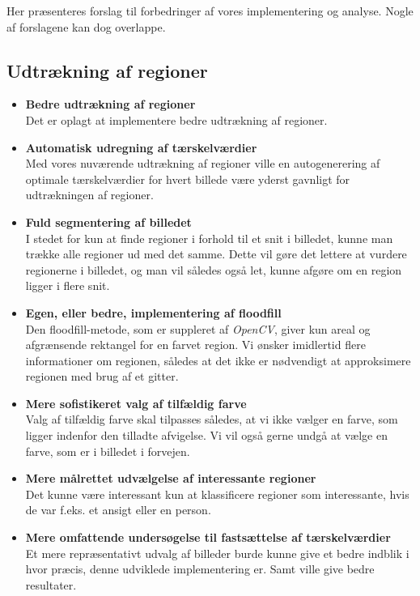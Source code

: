 {
{\sffamily Her præsenteres forslag til forbedringer af vores
implementering og analyse. Nogle af forslagene kan dog overlappe.
}

\subsection{Udtrækning af regioner}
\begin{itemize}
     \item \textbf{Bedre udtrækning af regioner}\\
        Det er oplagt at implementere bedre udtrækning af regioner.
     \item \textbf{Automatisk udregning af tærskelværdier}\\
        Med vores nuværende udtrækning af regioner ville en
        autogenerering af optimale tærskelværdier for hvert billede
        være yderst gavnligt for udtrækningen af regioner.
    \item \textbf{Fuld segmentering af billedet}\\
        I stedet for kun at finde regioner i forhold til et snit i
        billedet, kunne man trække alle regioner ud med det samme. Dette
        vil gøre det lettere at vurdere regionerne i billedet, og man
        vil således også let, kunne afgøre om en region ligger i flere snit.
  \item \textbf{Egen, eller bedre, implementering af floodfill}\\
        Den floodfill-metode, som er suppleret af \emph{OpenCV}, giver
        kun areal og afgrænsende rektangel for en farvet region. Vi
        ønsker imidlertid flere informationer om regionen, således at
        det ikke er nødvendigt at approksimere regionen med brug af et
        gitter.
    \item \textbf{Mere sofistikeret valg af tilfældig farve}\\
        Valg af tilfældig farve skal tilpasses således, at vi ikke
        vælger en farve, som ligger indenfor den tilladte afvigelse.
        Vi vil også gerne undgå at vælge en farve, som er i billedet i
        forvejen.
    \item \textbf{Mere målrettet udvælgelse af interessante regioner}\\
        Det kunne være interessant kun at klassificere regioner som
        interessante, hvis de var f.eks. et ansigt eller en person.
    \item \textbf{Mere omfattende undersøgelse til fastsættelse af tærskelværdier}\\
		Et mere repræsentativt udvalg af billeder burde kunne give et
		bedre indblik i hvor præcis, denne udviklede implementering er.
		Samt ville give bedre resultater.
\end{itemize}

}
